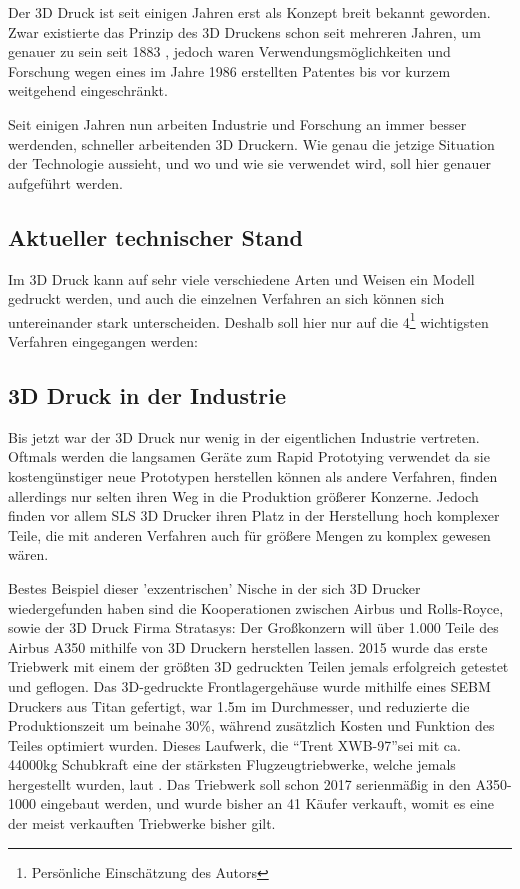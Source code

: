 
Der 3D Druck ist seit einigen Jahren erst als Konzept breit bekannt geworden.
Zwar existierte das Prinzip des 3D Druckens schon seit mehreren Jahren, um genauer zu sein seit 1883 \parencite{CHUCK}, jedoch waren Verwendungsmöglichkeiten und Forschung wegen eines im Jahre 1986 erstellten Patentes bis vor kurzem weitgehend eingeschränkt.

Seit einigen Jahren nun arbeiten Industrie und Forschung an immer besser werdenden, schneller arbeitenden 3D Druckern. Wie genau die jetzige Situation der Technologie aussieht, und wo und wie sie verwendet wird, soll hier genauer aufgeführt werden.

\subsection{Aktueller technischer Stand}

Im 3D Druck kann auf sehr viele verschiedene Arten und Weisen ein Modell gedruckt werden, und auch die einzelnen Verfahren an sich können sich untereinander stark unterscheiden.
Deshalb soll hier nur auf die 4\footnote{Persönliche Einschätzung des Autors} wichtigsten Verfahren eingegangen werden:






\subsection{3D Druck in der Industrie}

Bis jetzt war der 3D Druck nur wenig in der eigentlichen Industrie vertreten. Oftmals werden die langsamen Geräte zum Rapid Prototying verwendet da sie kostengünstiger neue Prototypen herstellen können als andere Verfahren, finden allerdings nur selten ihren Weg in die Produktion größerer Konzerne. Jedoch finden vor allem SLS 3D Drucker ihren Platz in der Herstellung hoch komplexer Teile, die mit anderen Verfahren auch für größere Mengen zu komplex gewesen wären. 

Bestes Beispiel dieser 'exzentrischen' Nische in der sich 3D Drucker wiedergefunden haben sind die Kooperationen zwischen Airbus und Rolls-Royce, sowie der 3D Druck Firma Stratasys: Der Großkonzern will über 1.000 Teile des Airbus A350 mithilfe von 3D Druckern herstellen lassen. 2015 wurde das erste Triebwerk mit einem der größten 3D gedruckten Teilen jemals erfolgreich getestet und geflogen. Das 3D-gedruckte Frontlagergehäuse wurde mithilfe eines SEBM Druckers aus Titan gefertigt, war 1.5m im Durchmesser, und reduzierte die Produktionszeit um beinahe 30\%, während zusätzlich Kosten und Funktion des Teiles optimiert wurden. Dieses Laufwerk, die \textquotedblleft Trent XWB-97\textquotedblright sei mit ca. 44000kg Schubkraft eine der stärksten Flugzeugtriebwerke, welche jemals hergestellt wurden, laut \textcite{TRENT}. Das Triebwerk soll schon 2017 serienmäßig in den A350-1000 eingebaut werden, und wurde bisher an 41 Käufer verkauft, womit es eine der meist verkauften Triebwerke bisher gilt.

